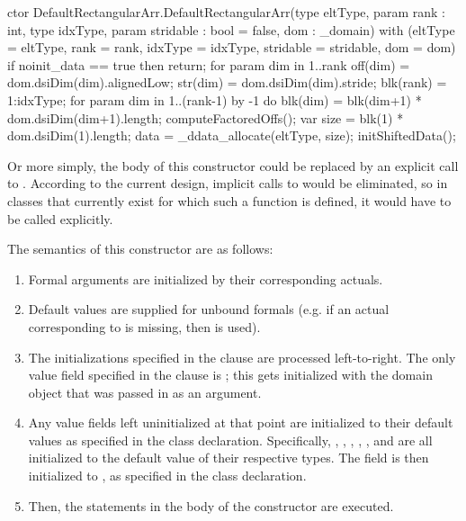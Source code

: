 \begin{chapel}
ctor DefaultRectangularArr.DefaultRectangularArr(type eltType,
                                                 param rank : int,
                                                 type idxType,
                                                 param stridable : bool = false,
                                                 dom : _domain)
  with (eltType = eltType, 
        rank = rank, 
        idxType = idxType, 
        stridable = stridable,
        dom = dom) {
    if noinit_data == true then return;
    for param dim in 1..rank {
      off(dim) = dom.dsiDim(dim).alignedLow;
      str(dim) = dom.dsiDim(dim).stride;
    }
    blk(rank) = 1:idxType;
    for param dim in 1..(rank-1) by -1 do
      blk(dim) = blk(dim+1) * dom.dsiDim(dim+1).length;
    computeFactoredOffs();
    var size = blk(1) * dom.dsiDim(1).length;
    data = _ddata_allocate(eltType, size);
    initShiftedData();
}
\end{chapel}
Or more simply, the body of this constructor could be replaced by an explicit call to
.  According to the current design, implicit calls to
 would be eliminated, so in classes that currently exist for which such
a function is defined, it would have to be called explicitly.

The semantics of this constructor are as follows:
\begin{enumerate}
\item Formal arguments are initialized by their corresponding actuals.
\item Default values are supplied for unbound formals (e.g. if an actual corresponding to
   is missing, then  is used).
\item The initializations specified in the  clause are processed
  left-to-right.  The only value field specified in the  clause is ;
  this gets initialized with the domain object that was passed in as an argument.
\item Any value fields left uninitialized at that point are initialized to their default
  values as specified in the class declaration.  Specifically, , ,
  , , ,  and  are
  all initialized to the default value of their respective types.  The
   field is then initialized to , as specified in the class
  declaration.
\item Then, the statements in the body of the constructor are executed.
\end{enumerate}

